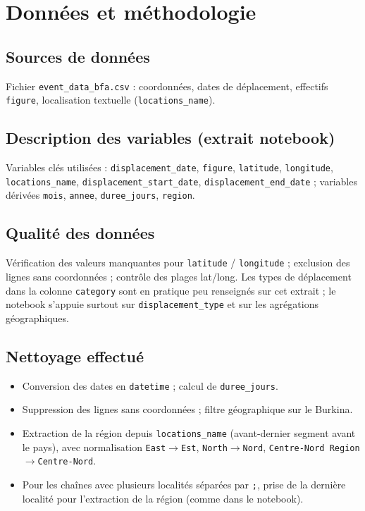 \documentclass[11pt,a4paper]{report}
\begin{document}
\chapter{Données et méthodologie}

\section{Sources de données}
Fichier \texttt{event\_data\_bfa.csv} : coordonnées, dates de déplacement, effectifs \texttt{figure},
localisation textuelle (\texttt{locations\_name}).

\section{Description des variables (extrait notebook)}
Variables clés utilisées : \texttt{displacement\_date}, \texttt{figure}, \texttt{latitude},
\texttt{longitude}, \texttt{locations\_name}, \texttt{displacement\_start\_date},
\texttt{displacement\_end\_date} ; variables dérivées \texttt{mois}, \texttt{annee},
\texttt{duree\_jours}, \texttt{region}.

\section{Qualité des données}
Vérification des valeurs manquantes pour \texttt{latitude} / \texttt{longitude} ; exclusion des
lignes sans coordonnées ; contrôle des plages lat/long. Les types de déplacement dans la colonne
\texttt{category} sont en pratique peu renseignés sur cet extrait ; le notebook s'appuie surtout sur
\texttt{displacement\_type} et sur les agrégations géographiques.

\section{Nettoyage effectué}
\begin{itemize}
  \item Conversion des dates en \texttt{datetime} ; calcul de \texttt{duree\_jours}.
  \item Suppression des lignes sans coordonnées ; filtre géographique sur le Burkina.
  \item Extraction de la région depuis \texttt{locations\_name} (avant-dernier segment avant le pays),
  avec normalisation \texttt{East}$\rightarrow$\texttt{Est}, \texttt{North}$\rightarrow$\texttt{Nord},
  \texttt{Centre-Nord Region}$\rightarrow$\texttt{Centre-Nord}.
  \item Pour les chaînes avec plusieurs localités séparées par \texttt{;}, prise de la dernière localité
  pour l'extraction de la région (comme dans le notebook).
\end{itemize}
\end{document}
